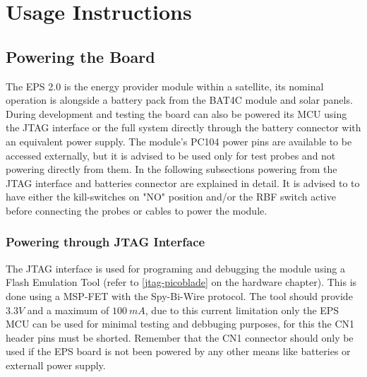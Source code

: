%
%
%
%
%

%
%
%
%
%
%

\chapter{Usage Instructions} \label{ch:instructions}

\section{Powering the Board}

The EPS 2.0 is the energy provider module within a satellite, its nominal operation is alongside a battery pack from the BAT4C module and solar panels. 
During development and testing the board can also be powered its MCU using the JTAG interface or the full system directly through the battery connector with an equivalent power supply. The module's PC104 power pins are available to be accessed externally, but it is advised to be used only for test probes and not powering directly from them. 
In the following subsections powering from the JTAG interface and batteries connector are explained in detail. 
It is advised to to have either the kill-switches on "NO" position and/or the RBF switch active before connecting the probes or cables to power the module.

 
\subsection{Powering through JTAG Interface}

The JTAG interface is used for programing and debugging the module using a Flash Emulation Tool (refer to \autoref{jtag-picoblade} on the hardware chapter). 
This is done using a MSP-FET with the Spy-Bi-Wire protocol.
The tool should provide $3.3 V$ and a maximum of $100\ mA$, due to this current limitation only the EPS MCU can be used for minimal testing and debbuging purposes, for this the CN1 header pins must be shorted.
Remember that the CN1 connector should only be used if the EPS board is not been powered by any other means like batteries or externall power supply.

